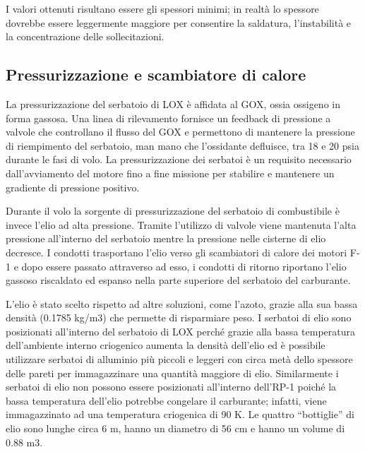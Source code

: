 I valori ottenuti risultano essere gli spessori minimi; in realtà lo spessore dovrebbe essere leggermente maggiore per consentire la saldatura, l'instabilità e la concentrazione delle sollecitazioni. 

\subsection{Pressurizzazione e scambiatore di calore}
\label{subsec:pressurizzazione_e_scambiatore_di_calore}

La pressurizzazione del serbatoio di LOX è affidata al GOX, ossia ossigeno in forma gassosa. Una linea di rilevamento fornisce un feedback di pressione a valvole che controllano il flusso del GOX e permettono di mantenere la pressione di riempimento del serbatoio, man mano che l’ossidante defluisce, tra 18 e 20 psia durante le fasi di volo. La pressurizzazione dei serbatoi è un requisito necessario dall’avviamento del motore fino a fine missione per stabilire e mantenere un gradiente di pressione positivo.

Durante il volo la sorgente di pressurizzazione del serbatoio di combustibile è invece l’elio ad alta pressione. Tramite l’utilizzo di valvole viene mantenuta l’alta pressione all’interno del serbatoio mentre la pressione nelle cisterne di elio decresce. 
I condotti trasportano l’elio verso gli scambiatori di calore dei motori F-1 e dopo essere passato attraverso ad esso, i condotti di ritorno riportano l’elio gassoso riscaldato ed espanso nella parte superiore del serbatoio del carburante.

L’elio è stato scelto rispetto ad altre soluzioni, come l’azoto, grazie alla sua bassa densità (0.1785 kg/m3) che permette di risparmiare peso.
I serbatoi di elio sono posizionati all’interno del serbatoio di LOX perché grazie alla bassa temperatura dell’ambiente interno criogenico aumenta la densità dell’elio ed è possibile utilizzare serbatoi di alluminio più piccoli e leggeri con circa metà dello spessore delle pareti per immagazzinare una quantità maggiore di elio.
Similarmente i serbatoi di elio non possono essere posizionati all’interno dell’RP-1 poiché la bassa temperatura dell’elio potrebbe congelare il carburante; infatti, viene immagazzinato ad una temperatura criogenica di 90 K.
Le quattro “bottiglie” di elio sono lunghe circa 6 m, hanno un diametro di 56 cm e hanno un volume di 0.88 m3.

